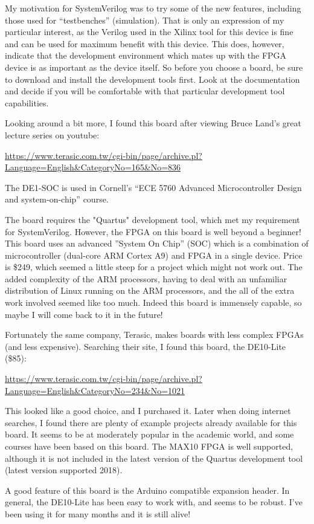My motivation for SystemVerilog was to try some of the new features, including those used for ``testbenches'' (simulation).  That is only an expression of my particular interest, as the Verilog used in the Xilinx tool for this device is fine and can be used for maximum benefit with this device.  This does, however, indicate that the development environment which mates up with the FPGA device is as important as the device itself.  So before you choose a board, be sure to download and install the development tools first.  Look at the documentation and decide if you will be comfortable with that particular development tool capabilities.

Looking around a bit more, I found this board after viewing Bruce Land's great lecture series on youtube:

\url{https://www.terasic.com.tw/cgi-bin/page/archive.pl?Language=English&CategoryNo=165&No=836}

The DE1-SOC is used in Cornell's ``ECE 5760 Advanced Microcontroller Design and system-on-chip'' course.

The board requires the "Quartus" development tool, which met my requirement for SystemVerilog.  However, the FPGA on this board is well beyond a beginner!  This board uses an advanced ''System On Chip'' (SOC) which is a combination of microcontroller (dual-core ARM Cortex A9) and FPGA in a single device.  Price is \$249, which seemed a little steep for a project which might not work out.  The added complexity of the ARM processors, having to deal with an unfamiliar distribution of Linux running on the ARM processors, and the all of the extra work involved seemed like too much.  Indeed this board is immensely capable, so maybe I will come back to it in the future!

Fortunately the same company, Terasic, makes boards with less complex FPGAs (and less expensive).  Searching their site, I found this board, the DE10-Lite (\$85):

\url{https://www.terasic.com.tw/cgi-bin/page/archive.pl?Language=English&CategoryNo=234&No=1021}

This looked like a good choice, and I purchased it.  Later when doing internet searches, I found there are plenty of example projects already available for this board.  It seems to be at moderately popular in the academic world, and some courses have been based on this board.  The MAX10 FPGA is well supported, although it is not included in the latest version of the Quartus development tool (latest version supported 2018).

A good feature of this board is the Arduino compatible expansion header.  In general, the DE10-Lite has been easy to work with, and seems to be robust.  I've been using it for many months and it is still alive!



